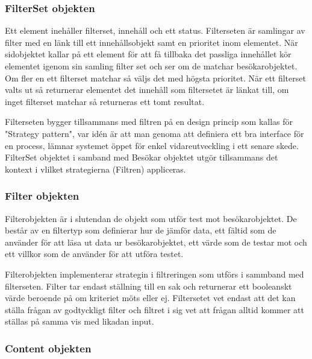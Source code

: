 \subsubsection{FilterSet objekten}



Ett element inehåller filterset, innehåll och ett status. Filterseten är samlingar av filter med en länk till ett innehållsobjekt samt en prioritet inom elementet. När sidobjektet kallar på ett element för att få tillbaka det passliga innehållet kör elementet igenom sin samling filter set och ser om de matchar besökarobjektet. Om fler en ett filterset matchar så väljs det med högsta prioritet. När ett filterset valts ut så returnerar elementet det innehåll som filtersetet är länkat till, om inget filterset matchar så returneras ett tomt resultat.

Filterseten bygger tillsammans med filtren på en design princip som kallas för "Strategy pattern", var idén är att man genoma att definiera ett bra interface för en process, lämnar systemet öppet för enkel vidareutveckling i ett senare skede. FilterSet objektet i samband med Besökar objektet utgör tillsammans det kontext i vlilket strategierna (Filtren) appliceras.

\subsubsection{Filter objekten}



Filterobjekten är i slutendan de objekt som utför test mot besökarobjektet. De består av en filtertyp som definierar hur de jämför data, ett fältid som de använder för att läsa ut data ur besökarobjektet, ett värde som de testar mot och ett villkor som de använder för att utföra testet.

Filterobjekten implementerar strategin i filtreringen som utförs i sammband med filterseten. Filter tar endast ställning till en sak och returnerar ett booleanskt värde beroende på om kriteriet möts eller ej. Filtersetet vet endast att det kan ställa frågan av godtyckligt filter och filtret i sig vet att frågan alltid kommer att ställas på samma vis med likadan input.

\subsubsection{Content objekten}



